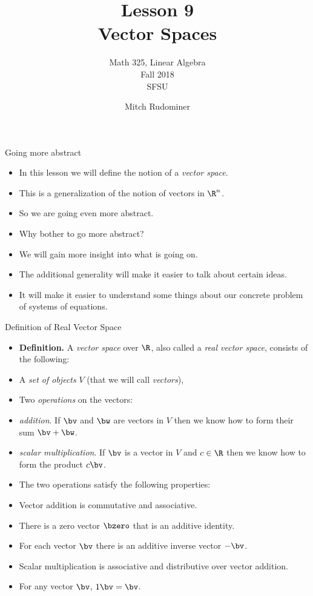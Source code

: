 \documentclass{beamer}
\title{Lesson 9 \\ Vector Spaces}
\subtitle{Math 325, Linear Algebra \\ Fall 2018 \\ SFSU}
\author{Mitch Rudominer}
\date{}
\begin{document}
\begin{frame}
  \titlepage
\end{frame}

\begin{frame}{Going more abstract}

\begin{itemize}
\item In this lesson we will define the notion of a \emph{vector space}.
\item This is a generalization of the notion of vectors in $\R^n$.
\item So we are going even more abstract.
\item Why bother to go more abstract?
\item We will gain more insight into what is going on.
\item The additional generality will make it easier to talk about certain ideas.
\item It will make it easier to understand some things about our concrete
problem of systems of equations.
\end{itemize}
\end{frame}

\begin{frame}{Definition of Real Vector Space}

\begin{itemize}
\item \textbf{Definition.} A \emph{vector space} over $\R$, also called
a \emph{real vector space}, consists of the following:
\item A \emph{set of objects} $V$ (that we will call \emph{vectors}),
\item Two \emph{operations} on the vectors:
\item \emph{addition}. If $\bv$ and $\bw$ are vectors in $V$ then
we know how to form their sum $\bv+\bw$.
\item \emph{scalar multiplication}. If $\bv$ is a vector in $V$ and
$c\in\R$ then we know how to form the product $c\bv$.
\item The two operations satisfy the following properties:
\item Vector addition is commutative and associative.
\item There is a zero vector $\bzero$ that is an additive identity.
\item For each vector $\bv$ there is an additive inverse vector $-\bv$.
\item Scalar multiplication is associative and distributive over vector addition.
\item For any vector $\bv$, $1\bv = \bv$.
\end{itemize}
\end{frame}
\end{document}
